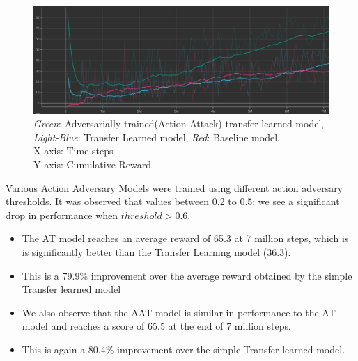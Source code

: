 \begin{figure}[H]
    \centering
    \includegraphics[width=1.0\textwidth]{images/graphs/AAT2-TL-OneKInk-TwoKink.png}
    \caption{\centering \textit{Green}: Adversarially trained(Action Attack) transfer learned model, \textit{Light-Blue}: Transfer Learned model, \textit{Red}: Baseline model. \\ X-axis: Time steps \\ Y-axis: Cumulative Reward }
   
    
    \label{fig:my_label}
\end{figure}



 Various Action Adversary Models were trained using different action adversary thresholds. It was observed that values between 0.2 to 0.5; we see a significant drop in performance when $threshold > 0.6$. 

\begin{itemize}
    \item The AT model reaches an average reward of 65.3 at 7 million steps, which is is significantly better than the Transfer Learning model (36.3).
    \item This is a 79.9\% improvement over the average reward obtained by the simple Transfer learned model
    \item We also observe that the AAT model is similar in performance to the AT model and reaches a score of 65.5 at the end of 7 million steps.
    \item This is again a 80.4\% improvement over the simple Transfer learned model.
\end{itemize}

